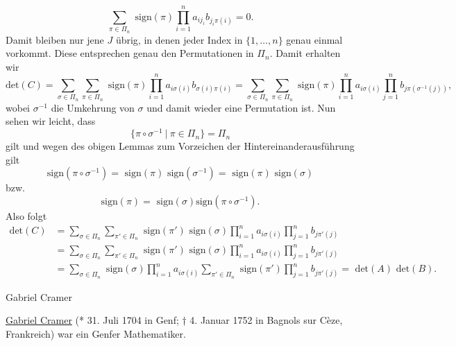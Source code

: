 \documentclass[letterpaper,10pt,english]{jupyterBook}
\begin{document}
\begin{emphBox}{}{}
\begin{equation*}
 \sum_{\pi \in \Pi_n} \text{ sign}(\pi)\prod_{i=1}^n  a_{ij_i} b_{j_i\pi(i)}  = 0.
\end{equation*}
Damit bleiben nur jene \(J\) übrig, in denen jeder Index in \(\{1,\ldots,n\}\) genau einmal vorkommt. Diese entsprechen genau den Permutationen in \(\Pi_n\). Damit erhalten wir
\begin{equation*}
 \text{det}(C) =  \sum_{\sigma \in \Pi_n} \sum_{\pi \in \Pi_n} \text{ sign}(\pi)\prod_{i=1}^n  a_{i\sigma(i)} b_{\sigma(i) \pi(i)} =  \sum_{\sigma \in \Pi_n} \sum_{\pi \in \Pi_n} \text{ sign}(\pi)\prod_{i=1}^n  a_{i\sigma(i)} \prod_{j=1}^n  b_{j \pi(\sigma^{-1}(j))},
\end{equation*}
wobei \(\sigma^{-1}\) die Umkehrung von \(\sigma\) und damit wieder eine Permutation ist. Nun sehen wir leicht, dass
\begin{equation*}
 \{ \pi \circ \sigma^{-1}~|~\pi \in \Pi_n\} = \Pi_n
\end{equation*}
gilt und wegen des obigen Lemmas zum Vorzeichen der Hintereinanderausführung gilt
\begin{equation*}
 \text{sign}(\pi \circ \sigma^{-1}) = \text{ sign}(\pi) \text{ sign}(\sigma^{-1}) = \text{ sign}(\pi) \text{ sign}(\sigma )\end{equation*}
bzw.
\begin{equation*}
  \text{sign}(\pi ) = \text{ sign}(\sigma)  \text{sign}(\pi \circ \sigma^{-1}).
\end{equation*}
Also folgt
\begin{align*} \text{det}(C) &=  \sum_{\sigma \in \Pi_n} \sum_{\pi' \in \Pi_n} \text{ sign}(\pi') \text{ sign}(\sigma) \prod_{i=1}^n  a_{i\sigma(i)} \prod_{j=1}^n  b_{j \pi'(j)} \\  &= \sum_{\sigma \in \Pi_n} \sum_{\pi' \in \Pi_n} \text{ sign}(\pi') \text{ sign}(\sigma) \prod_{i=1}^n  a_{i\sigma(i)} \prod_{j=1}^n  b_{j \pi'(j)}  \\  &= \sum_{\sigma \in \Pi_n} \text{ sign}(\sigma) \prod_{i=1}^n  a_{i\sigma(i)} \sum_{\pi' \in \Pi_n} \text{ sign}(\pi')   \prod_{j=1}^n  b_{j \pi'(j)}  = \text{ det}(A) \text{ det}(B). \end{align*}\end{emphBox}

\begin{emphBox}{Gabriel Cramer}{}

\href{https://de.wikipedia.org/wiki/Gabriel\_Cramer}{Gabriel Cramer} (* 31. Juli 1704 in Genf; † 4. Januar 1752 in Bagnols sur Cèze, Frankreich) war ein Genfer Mathematiker.
\end{emphBox}
\end{document}
